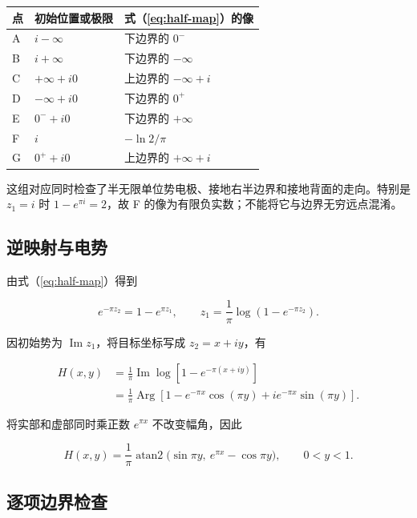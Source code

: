\documentclass[
  11pt,
  a4paper,
  oneside,
  openany]{report}
\numberwithin{equation}{chapter}
\begin{document}
\begin{longtable}[]{@{}lll@{}}
\toprule\noalign{}
点 & 初始位置或极限 & 式（\ref{eq:half-map}）的像 \\
\midrule\noalign{}
\endhead
\bottomrule\noalign{}
\endlastfoot
A & \(i-\infty\) & 下边界的 \(0^-\) \\
B & \(i+\infty\) & 下边界的 \(-\infty\) \\
C & \(+\infty+i0\) & 上边界的 \(-\infty+i\) \\
D & \(-\infty+i0\) & 下边界的 \(0^+\) \\
E & \(0^-+i0\) & 下边界的 \(+\infty\) \\
F & \(i\) & \(-\ln2/\pi\) \\
G & \(0^++i0\) & 上边界的 \(+\infty+i\) \\
\end{longtable}

这组对应同时检查了半无限单位势电极、接地右半边界和接地背面的走向。特别是
\(z_1=i\) 时 \(1-e^{\pi i}=2\)，故 F
的像为有限负实数；不能将它与边界无穷远点混淆。

\subsection{逆映射与电势}\label{ux9006ux6620ux5c04ux4e0eux7535ux52bf}

由式（\ref{eq:half-map}）得到

\begin{equation}
e^{-\pi z_2}=1-e^{\pi z_1},\qquad
z_1=\frac1\pi\log(1-e^{-\pi z_2}).
\end{equation}

因初始势为 \(\operatorname{Im}z_1\)，将目标坐标写成 \(z_2=x+iy\)，有

\begin{align}
H(x,y)&=\frac1\pi\operatorname{Im}\log[1-e^{-\pi(x+iy)}]\\
&=\frac1\pi\operatorname{Arg}
[1-e^{-\pi x}\cos(\pi y)+ie^{-\pi x}\sin(\pi y)].
\end{align}

将实部和虚部同时乘正数 \(e^{\pi x}\) 不改变幅角，因此

\begin{equation}
H(x,y)=\frac1\pi\operatorname{atan2}
\bigl(\sin\pi y,\ e^{\pi x}-\cos\pi y\bigr),
\qquad0<y<1.
\label{eq:half-potential}
\end{equation}

\subsection{逐项边界检查}\label{ux9010ux9879ux8fb9ux754cux68c0ux67e5}
\end{document}
